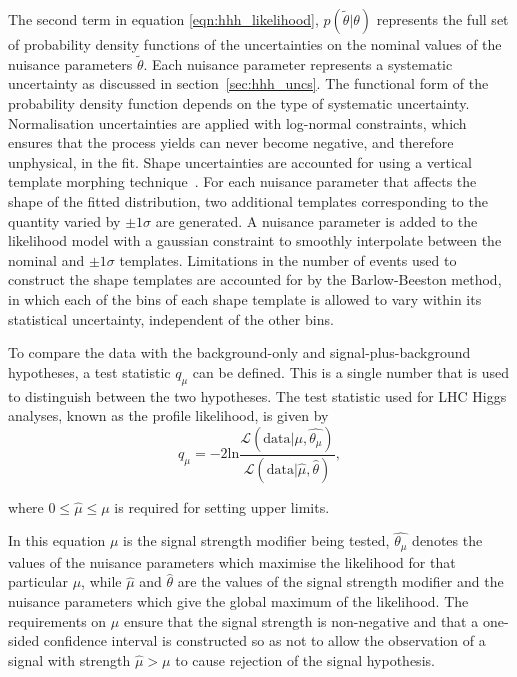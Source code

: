 The second term in equation \ref{eqn:hhh_likelihood}, $p(\tilde{\theta}|\theta)$ represents the full set of 
probability density functions of the uncertainties on the nominal
values of the nuisance parameters $\tilde{\theta}$. Each nuisance parameter represents a systematic uncertainty
as discussed in section~\ref{sec:hhh_uncs}. The functional form of the probability density function
depends on the type of systematic uncertainty. Normalisation uncertainties are applied with log-normal constraints, which
ensures that the process yields can never become negative, and therefore unphysical, in the fit. 
Shape uncertainties are accounted for using a vertical template morphing
technique~\cite{temp-morph-2011}. For each nuisance parameter that affects the shape of the fitted distribution, two additional
templates corresponding to the quantity varied by $\pm 1 \sigma$ are generated. A nuisance
parameter is added to the likelihood model with a gaussian constraint to smoothly interpolate between
the nominal and $\pm 1\sigma$ templates. Limitations in the number of events used to construct the shape templates
are accounted for by the Barlow-Beeston method\cite{BarlowBeeston}, in which each of the bins of each 
shape template is allowed to vary within its statistical uncertainty, independent of the other bins. %

To compare the data with the background-only and signal-plus-background hypotheses, a test
statistic $q_{\mu}$ can be defined. This is a single 
number that is used to distinguish between the two hypotheses. The test
statistic used for LHC Higgs analyses, known as the profile likelihood, is given 
by
\begin{equation}\label{eqn:hhh_profilelikelihood}
q_{\mu} = -2\text{ln}\frac{\mathcal{L}(\text{data}|\mu,\hat{\theta_{\mu}})}{\mathcal{L}(\text{data}|\hat{\mu},\hat{\theta})},
\end{equation}

where $0 \leq \hat{\mu} \leq \mu$ is required for setting upper limits.

In this equation $\mu$ is the signal strength modifier being tested, $\hat{\theta_{\mu}}$ denotes the values of the
nuisance parameters which maximise the likelihood for that particular $\mu$, while $\hat{\mu}$ and $\hat{\theta}$ are
the values of the signal strength modifier and the nuisance parameters which give the global maximum of the likelihood.
The requirements on $\mu$ ensure that the signal strength is non-negative and that
a one-sided confidence interval is constructed so as not to allow the observation of  a 
signal with strength $\hat{\mu} > \mu$ to cause rejection of the signal hypothesis.

